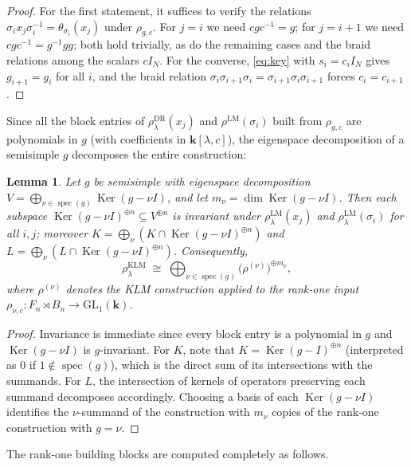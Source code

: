 \documentclass[11pt]{article}
\newtheorem{lemma}[theorem]{Lemma}
\theoremstyle{definition}
\theoremstyle{remark}
\newcommand{\GL}{\mathrm{GL}}
\newcommand{\Ker}{\operatorname{Ker}}
\newcommand{\spec}{\operatorname{spec}}
\newcommand{\kk}{\boldsymbol{k}}
\newcommand{\rLM}{\rho^{\mathrm{LM}}}
\newcommand{\rLMl}{\rho^{\mathrm{LM}}_{\lambda}}
\newcommand{\rKLM}{\rho^{\mathrm{KLM}}_{\lambda}}
\newcommand{\rDR}{\rho^{\mathrm{DR}}_{\lambda}}
\begin{document}
\begin{proof}
For the first statement, it suffices to verify the relations
$\sigma_i x_j \sigma_i^{-1} = \theta_{\sigma_i}(x_j)$ under $\rho_{g,c}$.
For $j = i$ we need $c g c^{-1} = g$; for $j = i+1$ we need
$c g c^{-1} = g^{-1} g g$; both hold trivially, as do the remaining cases
and the braid relations among the scalars $c I_N$. For the converse,
\eqref{eq:key} with $s_i = c_i I_N$ gives $g_{i+1} = g_i$ for all $i$, and
the braid relation $\sigma_i \sigma_{i+1}\sigma_i =
\sigma_{i+1}\sigma_i\sigma_{i+1}$ forces $c_i = c_{i+1}$.
\end{proof}

Since all the block entries of $\rDR(x_j)$ and $\rLM(\sigma_i)$ built from
$\rho_{g,c}$ are polynomials in $g$ (with coefficients in
$\kk[\lambda, c]$), the eigenspace decomposition of a semisimple $g$
decomposes the entire construction:

\begin{lemma}\label{lem:decomp}
Let $g$ be semisimple with eigenspace decomposition
$V = \bigoplus_{\nu \in \spec(g)} \Ker(g - \nu I)$, and let
$m_{\nu} = \dim \Ker(g - \nu I)$. Then each subspace $\Ker(g - \nu I)^{\oplus n} \subseteq
V^{\oplus n}$ is invariant under $\rLMl(x_j)$ and $\rLMl(\sigma_i)$ for all
$i, j$; moreover $K = \bigoplus_{\nu} (K \cap \Ker(g - \nu I)^{\oplus n})$ and
$L = \bigoplus_{\nu} (L \cap \Ker(g - \nu I)^{\oplus n})$. Consequently,
\[
\rKLM \;\cong\; \bigoplus_{\nu \in \spec(g)}
\bigl(\rho^{(\nu)}\bigr)^{\oplus m_{\nu}},
\]
where $\rho^{(\nu)}$ denotes the KLM construction applied to the rank-one
input $\rho_{\nu, c} \colon F_n \rtimes B_n \to \GL_1(\kk)$.
\end{lemma}

\begin{proof}
Invariance is immediate since every block entry is a polynomial in $g$ and
$\Ker(g - \nu I)$ is $g$-invariant. For $K$, note that
$K = \Ker(g - I)^{\oplus n}$ (interpreted as $0$ if
$1 \notin \spec(g)$), which is the direct sum of its intersections with
the summands. For $L$, the intersection of kernels of operators preserving
each summand decomposes accordingly. Choosing a basis of each $\Ker(g - \nu I)$
identifies the $\nu$-summand of the construction with $m_{\nu}$ copies of
the rank-one construction with $g = \nu$.
\end{proof}

The rank-one building blocks are computed completely as follows.
\end{document}
